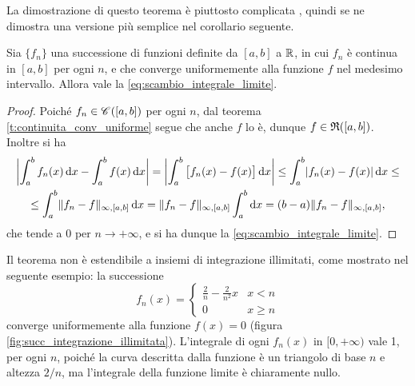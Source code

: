 La dimostrazione di questo teorema è piuttosto complicata%
, quindi se ne dimostra una versione più semplice nel corollario seguente.
\begin{corollario}
Sia $\{f_n\}$ una successione di funzioni definite da $[a,b]$ a $\R$, in cui $f_n$ è continua in $[a,b]$ per ogni $n$, e che converge uniformemente alla funzione $f$ nel medesimo intervallo. Allora vale la \eqref{eq:scambio_integrale_limite}.
\end{corollario}
\begin{proof}
Poiché $f_n\in\cont{[a,b]}$ per ogni $n$, dal teorema \ref{t:continuita_conv_uniforme} segue che anche $f$ lo è, dunque $f\in\rie{[a,b]}$. Inoltre si ha
\begin{multline*}
	\abs[\bigg]{\int_a^bf_n(x)\,\dd x-\int_a^bf(x)\,\dd x}=\abs[\bigg]{\int_a^b\big[f_n(x)-f(x)\big]\,\dd x}\leq\int_a^b\abs{f_n(x)-f(x)}\,\dd x\leq\\
\leq\int_a^b\norm{f_n-f}_{\infty,[a,b]}\,\dd x=\norm{f_n-f}_{\infty,[a,b]}\int_a^b\dd x=(b-a)\norm{f_n-f}_{\infty,[a,b]},
\end{multline*}
che tende a 0 per $n\to+\infty$, e si ha dunque la \eqref{eq:scambio_integrale_limite}.
\end{proof}
Il teorema non è estendibile a insiemi di integrazione illimitati, come mostrato nel seguente esempio: la successione
\[
f_n(x)=\begin{cases}\frac2{n}-\frac2{n^2}x&x<n\\0&x\geq n\end{cases}
\]
converge uniformemente alla funzione $f(x)=0$ (figura \ref{fig:succ_integrazione_illimitata}). L'integrale di ogni $f_n(x)$ in $[0,+\infty)$ vale 1, per ogni $n$, poiché la curva descritta dalla funzione è un triangolo di base $n$ e altezza $2/n$, ma l'integrale della funzione limite è chiaramente nullo.


